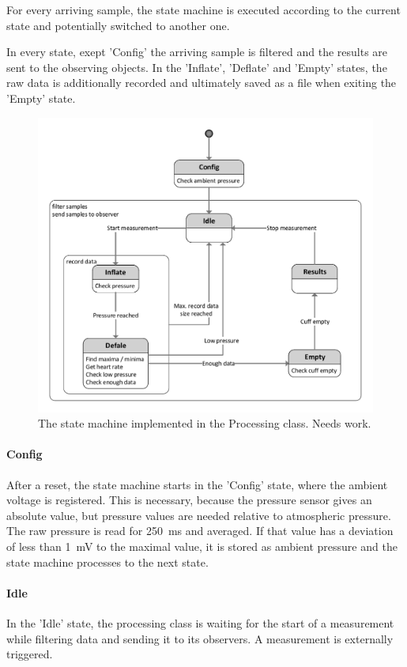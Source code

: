 For every arriving sample, the state machine is executed according to the current state and potentially switched to another one. 

In every state, exept 'Config' the arriving sample is filtered and the results are sent to the observing objects. In the 'Inflate', 'Deflate' and 'Empty' states, the raw data is additionally recorded and ultimately saved as a file when exiting the 'Empty' state. 


\begin{figure}[ht]
\centering
\includegraphics[width=\textwidth]{figures/state_machine.pdf}
\caption{The state machine implemented in the Processing class. Needs work.}
\label{fig:sm}
\end{figure}

\paragraph{Config} After a reset, the state machine starts in the 'Config' state, where the ambient voltage is registered. This is necessary, because the pressure sensor gives an absolute value, but pressure values are needed relative to atmospheric pressure. The raw pressure is read for \SI{250}{ms} and averaged. If that value has a deviation of less than \SI{1}{\milli\volt} to the maximal value, it is stored as ambient pressure and the state machine processes to the next state.

\paragraph{Idle} In the 'Idle' state, the processing class is waiting for the start of a measurement while filtering data and sending it to its observers. A measurement is externally triggered.

